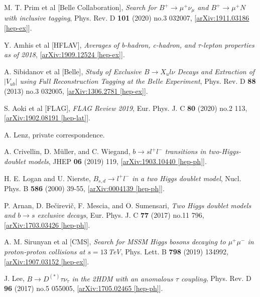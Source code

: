 \documentclass[a4paper,12pt]{article}
\begin{document}
\begin{thebibliography}{99}
M. T. Prim et al [Belle Collaboration], \emph{Search for $B^+\to\mu^+\nu_\mu$ and $B^+\to\mu^+N$ with inclusive tagging}, Phys. Rev. D \textbf{101} (2020) no.3 032007, [\href{https://arxiv.org/abs/1911.03186}{arXiv:1911.03186 [hep-ex]}].%

Y. Amhis et al [HFLAV], \emph{Averages of b-hadron, c-hadron, and $\tau$-lepton properties as of 2018}, [\href{https://arxiv.org/abs/1909.12524}{arXiv:1909.12524 [hep-ex]}].

A. Sibidanov et al [Belle], \emph{Study of Exclusive $B\to X_ul\nu$ Decays and Extraction of $|V_{ub}|$ using Full Reconstruction Tagging at the Belle Experiment}, Phys. Rev. D \textbf{88} (2013) no.3 032005, [\href{https://arxiv.org/abs/1306.2781}{arXiv:1306.2781 [hep-ex]}].%

S. Aoki et al [FLAG], \emph{FLAG Review 2019}, Eur. Phys. J. C \textbf{80} (2020) no.2 113, [\href{https://arxiv.org/abs/1902.08191}{arXiv:1902.08191 [hep-lat]}].%

A. Lenz, private correspondence.

A. Crivellin, D. M\"{u}ller, and C. Wiegand, \emph{$b\to sl^+l^-$ transitions in two-Higgs-doublet models}, JHEP \textbf{06} (2019) 119, [\href{https://arxiv.org/abs/1903.10440}{arXiv:1903.10440 [hep-ph]}].%

H. E. Logan and U. Nierste, \emph{$B_{s,d}\to l^+l^-$ in a two Higgs doublet model}, Nucl. Phys. B \textbf{586} (2000) 39-55, [\href{https://arxiv.org/abs/hep-ph/0004139}{arXiv:0004139 [hep-ph]}].%

P. Arnan, D. Be\v{c}irevi\v{c}, F. Mescia, and O. Sumensari, \emph{Two Higgs doublet models and $b\to s$ exclusive decays}, Eur. Phys. J. C \textbf{77} (2017) no.11 796, [\href{https://arxiv.org/abs/1703.03426}{arXiv:1703.03426 [hep-ph]}].%

A. M. Sirunyan et al [CMS], \emph{Search for MSSM Higgs bosons decaying to $\mu^+\mu^-$ in proton-proton collisions at $s=13\,$TeV}, Phys. Lett. B \textbf{798} (2019) 134992, [\href{https://arxiv.org/abs/1907.03152}{arXiv:1907.03152 [hep-ex]}].%

J. Lee, \emph{$B\to D^{(*)}\tau\nu_\tau$ in the 2HDM with an anomalous $\tau$ coupling}, Phys. Rev. D \textbf{96} (2017) no.5 055005, [\href{https://arxiv.org/abs/1705.02465}{arXiv:1705.02465 [hep-ph]}].%


\end{thebibliography}
\end{document}
